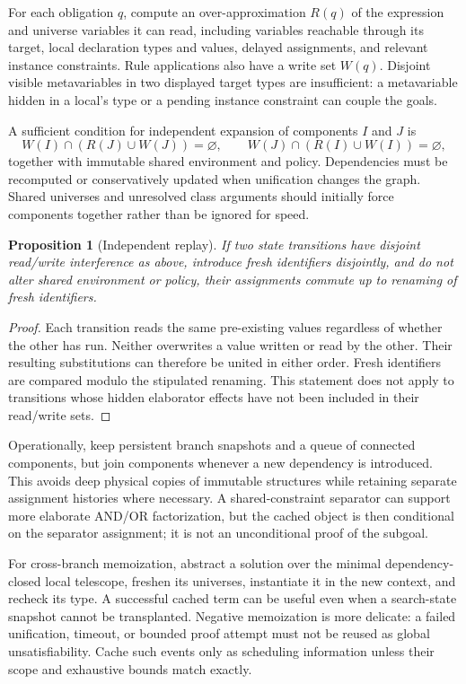 \documentclass[11pt,a4paper]{article}
\newtheorem{proposition}[theorem]{Proposition}
\theoremstyle{definition}
\theoremstyle{remark}
\begin{document}
For each obligation $q$, compute an over-approximation $R(q)$ of the expression and universe variables it can read, including variables reachable through its target, local declaration types and values, delayed assignments, and relevant instance constraints. Rule applications also have a write set $W(q)$. Disjoint visible metavariables in two displayed target types are insufficient: a metavariable hidden in a local's type or a pending instance constraint can couple the goals.

A sufficient condition for independent expansion of components $I$ and $J$ is
\[
 W(I)\cap(R(J)\cup W(J))=\varnothing,
 \qquad W(J)\cap(R(I)\cup W(I))=\varnothing,
\]
together with immutable shared environment and policy. Dependencies must be recomputed or conservatively updated when unification changes the graph. Shared universes and unresolved class arguments should initially force components together rather than be ignored for speed.

\begin{proposition}[Independent replay]
If two state transitions have disjoint read/write interference as above, introduce fresh identifiers disjointly, and do not alter shared environment or policy, their assignments commute up to renaming of fresh identifiers.
\end{proposition}
\begin{proof}
Each transition reads the same pre-existing values regardless of whether the other has run. Neither overwrites a value written or read by the other. Their resulting substitutions can therefore be united in either order. Fresh identifiers are compared modulo the stipulated renaming. This statement does not apply to transitions whose hidden elaborator effects have not been included in their read/write sets.
\end{proof}

Operationally, keep persistent branch snapshots and a queue of connected components, but join components whenever a new dependency is introduced. This avoids deep physical copies of immutable structures while retaining separate assignment histories where necessary. A shared-constraint separator can support more elaborate AND/OR factorization, but the cached object is then conditional on the separator assignment; it is not an unconditional proof of the subgoal.

For cross-branch memoization, abstract a solution over the minimal dependency-closed local telescope, freshen its universes, instantiate it in the new context, and recheck its type. A successful cached term can be useful even when a search-state snapshot cannot be transplanted. Negative memoization is more delicate: a failed unification, timeout, or bounded proof attempt must not be reused as global unsatisfiability. Cache such events only as scheduling information unless their scope and exhaustive bounds match exactly.
\end{document}
